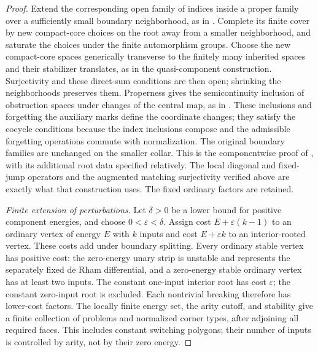\begin{proof}
Extend the corresponding open family of indices inside a proper
family over a sufficiently small boundary neighborhood, as in
\cite[Proposition~8.18]{FOOOChartsII}.  Complete its finite cover
by new compact-core choices on the root away from a smaller
neighborhood, and saturate the choices under the finite
automorphism groups.  Choose the new compact-core spaces generically
transverse to the finitely many inherited spaces and their
stabilizer translates, as in the quasi-component construction.
Surjectivity and these direct-sum conditions are then open;
shrinking the neighborhoods preserves them.
Properness gives the semicontinuity inclusion of obstruction
spaces under changes of the central map, as in
\cite[Proposition~8.17]{FOOOChartsII}.  These inclusions and
forgetting the auxiliary marks define the coordinate changes;
they satisfy the cocycle conditions because the index inclusions
compose and the admissible forgetting operations commute with
normalization.  The original boundary families are unchanged on
the smaller collar.  This is the componentwise proof of
\cite[Theorems~5.3 and~5.4]{FOOOChartsII}, with its additional root
data specified relatively.  The local diagonal and fixed-jump
operators and the augmented matching surjectivity verified above
are exactly what that construction uses.  The fixed ordinary
factors are retained.

\emph{Finite extension of perturbations.}
Let $\delta>0$ be a lower bound for positive component energies,
and choose $0<\varepsilon<\delta$.  Assign cost
$E+\varepsilon(k-1)$ to an ordinary vertex of energy $E$ with $k$
inputs and cost $E+\varepsilon k$ to an interior-rooted vertex.
These costs add under boundary splitting.  Every ordinary stable
vertex has positive cost: the zero-energy unary strip is unstable
and represents the separately fixed de Rham differential, and a
zero-energy stable ordinary vertex has at least two inputs.  The
constant one-input interior root has cost $\varepsilon$; the
constant zero-input root is excluded.  Each nontrivial breaking
therefore has lower-cost factors.  The locally finite energy set,
the arity cutoff, and stability give a finite collection of
problems and normalized corner types, after adjoining all required
faces.  This includes constant switching polygons; their number of
inputs is controlled by arity, not by their zero energy.


\end{proof}
